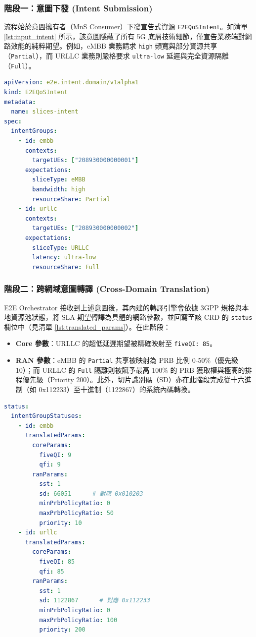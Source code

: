 \subsubsection{階段一：意圖下發 (Intent Submission)}
流程始於意圖擁有者（MnS Consumer）下發宣告式資源 \texttt{E2EQoSIntent}。如清單 \ref{lst:input_intent} 所示，該意圖隱蔽了所有 5G 底層技術細節，僅宣告業務端對網路效能的純粹期望。例如，eMBB 業務請求 \texttt{high} 頻寬與部分資源共享（\texttt{Partial}），而 URLLC 業務則嚴格要求 \texttt{ultra-low} 延遲與完全資源隔離（\texttt{Full}）。

\begin{lstlisting}[language=yaml, caption={MnS Consumer 下發之 E2EQoSIntent 完整定義}, label={lst:input_intent}]
apiVersion: e2e.intent.domain/v1alpha1
kind: E2EQoSIntent
metadata:
  name: slices-intent
spec:
  intentGroups:
    - id: embb
      contexts:
        targetUEs: ["208930000000001"]
      expectations:
        sliceType: eMBB
        bandwidth: high
        resourceShare: Partial
    - id: urllc
      contexts:
        targetUEs: ["208930000000002"]
      expectations:
        sliceType: URLLC
        latency: ultra-low
        resourceShare: Full
\end{lstlisting}

\subsubsection{階段二：跨網域意圖轉譯 (Cross-Domain Translation)}
E2E Orchestrator 接收到上述意圖後，其內建的轉譯引擎會依據 3GPP 規格與本地資源池狀態，將 SLA 期望轉譯為具體的網路參數，並回寫至該 CRD 的 \texttt{status} 欄位中（見清單 \ref{lst:translated_params}）。在此階段：
\begin{itemize}
    \item \textbf{Core 參數}：URLLC 的超低延遲期望被精確映射至 \texttt{fiveQI: 85}。
    \item \textbf{RAN 參數}：eMBB 的 \texttt{Partial} 共享被映射為 PRB 比例 0-50\%（優先級 10）；而 URLLC 的 \texttt{Full} 隔離則被賦予最高 100\% 的 PRB 獲取權與極高的排程優先級（Priority 200）。此外，切片識別碼（SD）亦在此階段完成從十六進制（如 0x112233）至十進制（1122867）的系統內碼轉換。
\end{itemize}

\begin{lstlisting}[language=yaml, caption={E2E Orchestrator 轉譯後之參數狀態 (片段)}, label={lst:translated_params}]
status:
  intentGroupStatuses:
    - id: embb
      translatedParams:
        coreParams:
          fiveQI: 9
          qfi: 9
        ranParams:
          sst: 1
          sd: 66051      # 對應 0x010203
          minPrbPolicyRatio: 0
          maxPrbPolicyRatio: 50
          priority: 10
    - id: urllc
      translatedParams:
        coreParams:
          fiveQI: 85
          qfi: 85
        ranParams:
          sst: 1
          sd: 1122867      # 對應 0x112233
          minPrbPolicyRatio: 0
          maxPrbPolicyRatio: 100
          priority: 200
\end{lstlisting}

